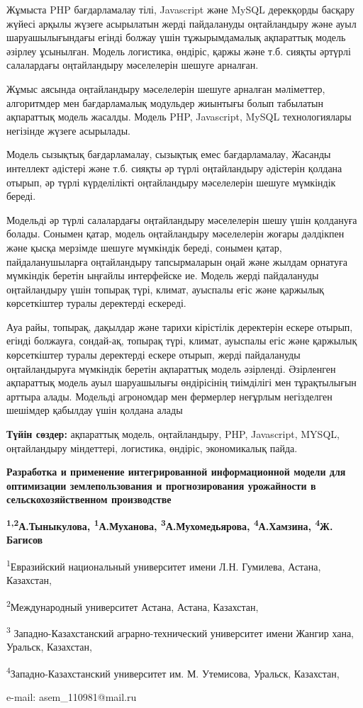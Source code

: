 Жұмыста PHP бағдарламалау тілі, Javascript және MySQL дерекқорды басқару
жүйесі арқылы жүзеге асырылатын жерді пайдалануды оңтайландыру және ауыл
шаруашылығындағы егінді болжау үшін тұжырымдамалық ақпараттық модель
әзірлеу ұсынылған. Модель логистика, өндіріс, қаржы және т.б. сияқты
әртүрлі салалардағы оңтайландыру мәселелерін шешуге арналған.

Жұмыс аясында оңтайландыру мәселелерін шешуге арналған мәліметтер,
алгоритмдер мен бағдарламалық модульдер жиынтығы болып табылатын
ақпараттық модель жасалды. Модель PHP, Javascript, MySQL технологиялары
негізінде жүзеге асырылады.

Модель сызықтық бағдарламалау, сызықтық емес бағдарламалау, Жасанды
интеллект әдістері және т.б. сияқты әр түрлі оңтайландыру әдістерін
қолдана отырып, әр түрлі күрделілікті оңтайландыру мәселелерін шешуге
мүмкіндік береді.

Модельді әр түрлі салалардағы оңтайландыру мәселелерін шешу үшін
қолдануға болады. Сонымен қатар, модель оңтайландыру мәселелерін жоғары
дәлдікпен және қысқа мерзімде шешуге мүмкіндік береді, сонымен қатар,
пайдаланушыларға оңтайландыру тапсырмаларын оңай және жылдам орнатуға
мүмкіндік беретін ыңғайлы интерфейске ие. Модель жерді пайдалануды
оңтайландыру үшін топырақ түрі, климат, ауыспалы егіс және қаржылық
көрсеткіштер туралы деректерді ескереді.

Ауа райы, топырақ, дақылдар және тарихи кірістілік деректерін ескере
отырып, егінді болжауға, сондай-ақ, топырақ түрі, климат, ауыспалы егіс
және қаржылық көрсеткіштер туралы деректерді ескере отырып, жерді
пайдалануды оңтайландыруға мүмкіндік беретін ақпараттық модель
әзірленді. Әзірленген ақпараттық модель ауыл шаруашылығы өндірісінің
тиімділігі мен тұрақтылығын арттыра алады. Модельді агрономдар мен
фермерлер неғұрлым негізделген шешімдер қабылдау үшін қолдана алады

{\bfseries Түйін сөздер:} ақпараттық модель, оңтайландыру, PHP, Javascript,
MYSQL, оңтайландыру міндеттері, логистика, өндіріс, экономикалық пайда.

\begin{center}
{\large\bfseries Разработка и применение интегрированной информационной модели
для оптимизации землепользования и прогнозирования урожайности в
сельскохозяйственном производстве}

{\bfseries \textsuperscript{1,2}А.Тыныкулова,
\textsuperscript{1}А.Муханова, \textsuperscript{3}А.Мухомедьярова,
\textsuperscript{4}А.Хамзина, \textsuperscript{4}Ж. Багисов}

\textsuperscript{1}Евразийский национальный университет имени Л.Н.
Гумилева, Астана, Казахстан,

\textsuperscript{2}Международный университет Астана, Астана, Казахстан,

\textsuperscript{3} Западно-Казахстанский аграрно-технический
университет имени Жангир хана, Уральск, Казахстан,

\textsuperscript{4}Западно-Казахстанский университет им. М. Утемисова,
Уральск, Казахстан,

e-mail: asem\_110981@mail.ru
\end{center}

